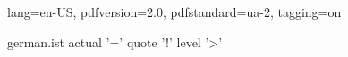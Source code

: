 \DocumentMetadata
  {
    lang=en-US,
    pdfversion=2.0,
    pdfstandard=ua-2,
    tagging=on
  }
\begin{filecontents}{german.ist}
actual '=' %
quote '!' %
level '>' %
\end{filecontents}
\documentclass[a4paper,12pt]{article}
\usepackage[T1]{fontenc}
\usepackage[ngerman]{babel}
\usepackage{makeidx}
\usepackage{sanitize-umlaut}
\usepackage[hyperindex,colorlinks]{hyperref}
\makeindex

\section{Basic Example}
Test äöüÄÖÜß.
\index{Aber} \index{Arg} \index{Ärger}
\index{Ofen} \index{Ö - wie schön} \index{oberhalb}
\index{Ufer} \index{Übermaß}
\index{Latex=\LaTeX} \index{Ärger>Index}
Test äöüÄÖÜß.
\printindex
